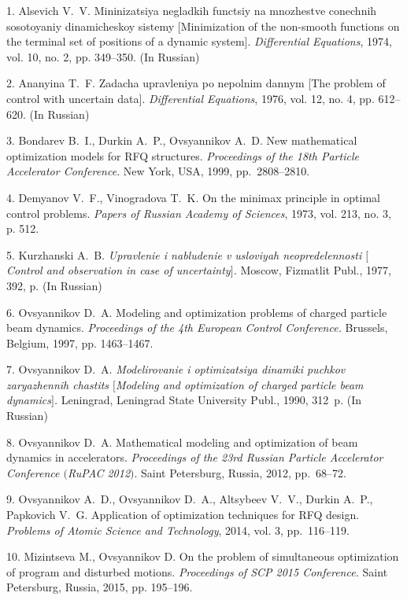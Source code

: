 {\footnotesize

\vskip 3mm


\vskip 2mm


1. Alsevich V.~V. Mininizatsiya negladkih functsiy na mnozhestve
conechnih sosotoyaniy dinamicheskoy sistemy [Minimization of the
non-smooth functions on the terminal set of positions of a dynamic
system]. \textit{Differential Equations}, 1974, vol. 10, no. 2,
pp. 349--350. (In Russian)

2. Ananyina T.~F. Zadacha upravleniya po nepolnim dannym [The
problem of control with uncertain data]. \textit{Differential
Equations}, 1976, vol. 12, no. 4, pp. 612--620. (In Russian)

3. Bondarev B.~I., Durkin A.~P., Ovsyannikov A.~D. New
mathematical optimization models for RFQ structures.
\textit{Proceedings of the 18th Particle Accelerator Conference}.
New York, USA, 1999, pp.~2808--2810.

4. Demyanov V.~F., Vinogradova T.~K. On the minimax principle in
optimal control problems. \textit{Papers of Russian Academy of
Sciences}, 1973, vol. 213, no. 3, p. 512.

5. Kurzhanski A.~B. {\it Upravlenie i nabludenie v usloviyah
neopredelennosti $[$Control and observation in case of
uncertainty$]$.} Moscow, Fizmatlit Publ., 1977, 392, p. (In
Russian)

6. Ovsyannikov D.~A. Modeling and optimization problems of charged
particle beam dynamics. \textit{Proceedings of the 4th European
Control Conference.} Brussels, Belgium, 1997, pp. 1463--1467.

7. Ovsyannikov D.~A. {\it Modelirovanie i optimizatsiya dinamiki
puchkov zaryazhennih chastits $[$Modeling and optimization of
charged particle beam dynamics$]$.} Leningrad, Leningrad State
University Publ., 1990, 312~p. (In Russian)

8. Ovsyannikov D.~A. Mathematical modeling and optimization of
beam dynamics in accelerators. \textit{Proceedings of the 23rd
Russian Particle Accelerator Conference $($RuPAC 2012$)$}. Saint
Petersburg, Russia, 2012, pp.~68--72.

9. Ovsyannikov A.~D., Ovsyannikov D.~A., Altsybeev V.~V., Durkin
A.~P., Papkovich V.~G. Application of optimization techniques for
RFQ design. \textit{Problems of Atomic Science and Technology},
2014, vol. 3, pp.~116--119.

10. Mizintseva M., Ovsyannikov D. On the problem of simultaneous
optimization of program and disturbed motions. \textit{Proceedings
of SCP 2015 Conference.}  Saint Petersburg, Russia, 2015, pp.
195--196.

}
